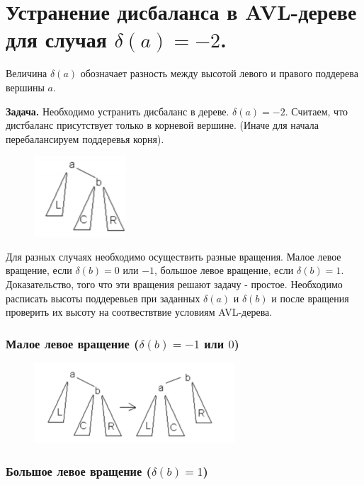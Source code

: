 \setcounter{section}{44}
\section{Устранение дисбаланса в AVL-дереве для случая $\delta(a) = -2$.}

Величина $\delta(a)$ обозначает разность между высотой левого и правого поддерева вершины $a$.

\textbf{Задача.} Необходимо устранить дисбаланс в дереве. $\delta(a) = -2$. Считаем, что дистбаланс присутствует только в корневой вершине. (Иначе для начала перебалансируем поддеревья корня).

\begin{figure}[h]
\begin{center}
\includegraphics[width=0.2\linewidth]{images/43-46_avl_rotate}
\label{fig:mpr}
\end{center}
\end{figure}

Для разных случаях необходимо осуществить разные вращения. Малое левое вращение, если $\delta(b) = 0$ или $-1$, большое левое вращение, если $\delta(b) = 1$. Доказательство, того что эти вращения решают задачу - простое. Необходимо расписать высоты поддеревьев при заданных $\delta(a)$ и $\delta(b)$ и после вращения проверить их высоту на соотвествтвие условиям AVL-дерева. 

\subsubsection*{Малое левое вращение ($\delta(b) = -1$ или $0$)} 

\begin{figure}[h]
\begin{center}
\includegraphics[width=0.4\linewidth]{images/43-46_avl_minrotate}
\label{fig:mpr}
\end{center}
\end{figure}

\subsubsection*{Большое левое вращение ($\delta(b) = 1$)}

